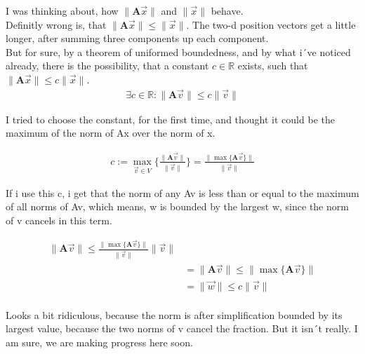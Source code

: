 \documentclass[a4paper]{article}
\begin{document}
I was thinking about, how $\|\boldsymbol{A}\vec{x}\|$ and $\|\vec{x}\|$ behave.\\

Definitly wrong is, that $\|\boldsymbol{A}\vec{x}\| \leq \|\vec{x}\|$. The two-d position vectors get a little longer, after summing three components up each component.\\ 

But for sure, by a theorem of uniformed boundedness, and by what i´ve noticed already,
there is the possibility, that a constant $c \in \mathbb{R}$ exists, such that $\|\boldsymbol{A}\vec{x}\| \leq c\|\vec{x}\|$.\\

\begin{displaymath}
\begin{align}
\exists c \in \mathbb{R}: \|\boldsymbol{A}\vec{v}\| \leq c\|\vec{v}\|
\end{align}
\end{displaymath}

I tried to choose the constant, for the first time, and thought it could be the maximum of the norm of Ax over the norm of x.

\begin{displaymath}
\begin{align}
c := \max_{\vec{v} \in V}\{ \frac{\|\boldsymbol{A}\vec{v}\|}{\|\vec{v}\|} \} = \frac{\|\max\{\boldsymbol{A}\vec{v}\}\|}{\|\vec{v}\|}
\end{align}
\end{displaymath}

If i use this c, i get that the norm of any Av is less than or equal to the maximum of all norms of Av, which means, w is bounded by the largest w, since the norm of v cancels in this term.

\begin{displaymath}
\begin{align}
\|\boldsymbol{A}\vec{v}\| \leq \frac{\|\max\{\boldsymbol{A}\vec{v}\}\|}{\|\vec{v}\|}\|\vec{v}\| \\
&= \|\boldsymbol{A}\vec{v}\| \leq \|\max\{\boldsymbol{A}\vec{v}\}\|\\
&= \|\vec{w}\| \leq c\|\vec{v}\| \\
\end{align}
\end{displaymath}

Looks a bit ridiculous, because the norm is after simplification bounded by its largest value, because the two norms of v cancel the fraction. But it isn´t really. I am sure, we are making progress here soon.\\
\end{document}
